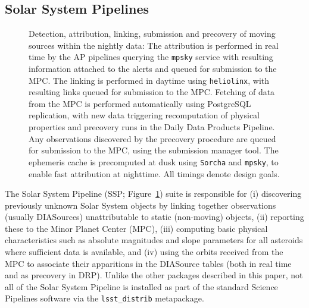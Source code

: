 \subsection{Solar System Pipelines}
\label{sec:solsys}

\begin{figure}
\begin{center}

\caption{\label{fig:ssp} Detection, attribution, linking, submission and precovery of moving sources within the nightly data: The attribution is performed in real time by the AP pipelines querying the \texttt{mpsky} service with resulting information attached to the alerts and queued for submission to the MPC.
The linking is performed in daytime using \texttt{heliolinx}, with resulting links queued for submission to the MPC.
Fetching of data from the MPC is performed automatically using PostgreSQL replication, with new data triggering recomputation of physical properties and precovery runs in the Daily Data Products Pipeline.
Any observations discovered by the precovery procedure are queued for submission to the MPC, using the submission manager tool.
The ephemeris cache is precomputed at dusk using \texttt{Sorcha} and \texttt{mpsky}, to enable fast attribution at nighttime.
All timings denote design goals.
}

\end{center}
\end{figure}
The Solar System Pipeline (SSP; Figure~\ref{fig:ssp}) suite is responsible for (i) discovering previously unknown Solar System objects by linking together observations (usually DIASources) unattributable to static (non-moving) objects, (ii) reporting these to the Minor Planet Center (MPC), (iii) computing basic physical characteristics such as absolute magnitudes and slope parameters for all asteroids where sufficient data is available, and (iv) using the orbits received from the MPC to associate their apparitions in the DIASource tables (both in real time and as precovery in DRP).
Unlike the other packages described in this paper, not all of the Solar System Pipeline is installed as part of the standard Science Pipelines software via the \texttt{lsst\_distrib} metapackage.

